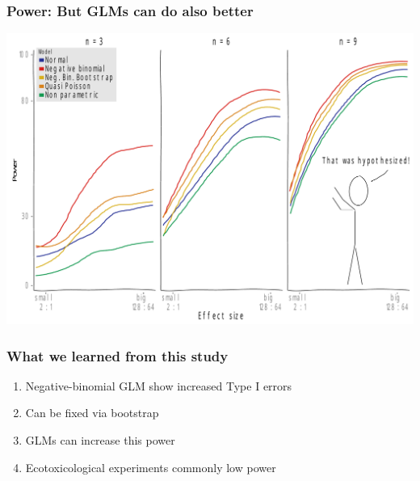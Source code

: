 \documentclass[
	12pt
	]{beamer}
\begin{document}
\begin{frame}
\frametitle{Power: But GLMs can do also better}
	\begin{center}
		\includegraphics[width = \textwidth]{figs/p_pow_xkcd.pdf}
	\end{center}
\end{frame}



\begin{frame}
\frametitle{What we learned from this study}
		\begin{enumerate}
			\item Negative-binomial GLM show increased \alert{Type I errors}
			\item Can be fixed via \alert{bootstrap}
			\item \alert{GLMs} can increase this  power
			\item Ecotoxicological experiments commonly \alert{low power} 
		\end{enumerate}
\end{frame}
\end{document}

